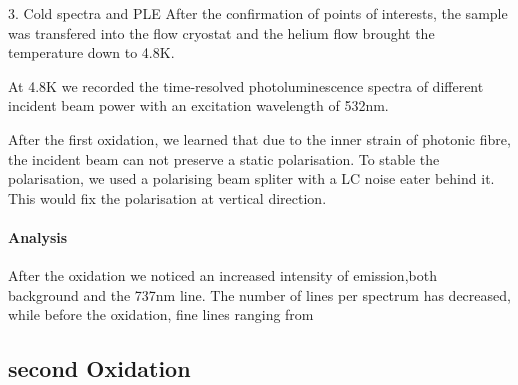 3. Cold spectra and PLE 
After the confirmation of points of interests, the sample was transfered into the flow cryostat and the helium flow brought the temperature down to 4.8K.

At 4.8K we recorded the time-resolved photoluminescence spectra of different incident beam power with an excitation wavelength of 532nm. 

After the first oxidation, we learned that due to the inner strain of photonic fibre, the incident beam can not preserve a static polarisation. To stable the polarisation, we used a polarising beam spliter with a LC noise eater behind it. This would fix the polarisation at vertical direction.

\paragraph{Analysis}
After the oxidation we noticed an increased intensity of emission,both background and the 737nm line. The number of lines per spectrum has decreased, while before the oxidation, fine lines ranging from  

\subsection[Second Oxidation]{second Oxidation}

